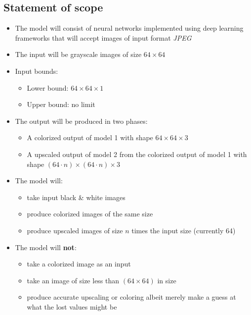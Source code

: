 \documentclass[oneside,a4paper,12pt]{report}
\begin{document}
 \subsection{Statement of scope} 
	\begin{itemize}  
	\item The model will consist of neural networks implemented using deep learning frameworks that will accept images of input format \textit{JPEG}
	\item The input will be grayscale images of size $64\times 64$ 
	\item Input bounds:
	\begin{itemize}
		\item Lower bound: $64\times 64\times 1$
		\item Upper bound: no limit
	\end{itemize}
	\item The output will be produced in two phases:
	\begin{itemize}
		\item A colorized output of model 1 with shape $64\times 64\times 3$
		\item A upscaled output of model 2 from the colorized output of model 1 with shape $(64\cdot n)\times (64\cdot n)\times 3$
	\end{itemize}
	\item The model will:
	\begin{itemize}
		\item take input black \& white images
		\item produce colorized images of the same size
		\item produce upscaled images of size $n$ times the input size (currently 64)
	\end{itemize}
	\item The model will \textbf{not}:
	\begin{itemize}
		\item take a colorized image as an input
		\item take an image of size less than $(64 \times 64)$ in size
		\item produce accurate upscaling or coloring albeit merely make a guess at what the lost values might be
	\end{itemize}
	\end{itemize}
\end{document}
